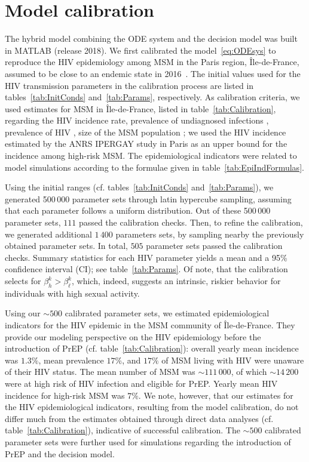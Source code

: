 \documentclass[11pt]{article}
\begin{document}
\newpage
\section{Model calibration} \label{sec:Calibration}

The hybrid model combining the ODE system and the decision model was built in MATLAB (release 2018). We first calibrated the model~\eqref{eq:ODEsys} to reproduce the HIV epidemiology among MSM in the Paris region, \^Ile-de-France, assumed to be close to an endemic state in 2016~\cite{RapportSPF2019}. The initial values used for the HIV transmission parameters in the calibration process are listed in tables~\ref{tab:InitConds} and~\ref{tab:Params}, respectively. As calibration criteria, we used estimates for MSM in \^Ile-de-France, listed in table~\ref{tab:Calibration}, regarding the HIV incidence rate, prevalence of undiagnosed infections \cite{Marty2019}, prevalence of HIV \cite{Prevagay2017}, size of the MSM population \cite{Bajos2018,Insee2015}; we used the HIV incidence estimated by the ANRS IPERGAY study in Paris \cite{Molina2018} as an upper bound for the incidence among high-risk MSM. The epidemiological indicators were related to model simulations according to the formulae given in table~\ref{tab:EpiIndFormulas}. 

Using the initial ranges (cf. tables~\ref{tab:InitConds} and~\ref{tab:Params}), we generated 500\,000 parameter sets through latin hypercube sampling, assuming that each parameter follows a uniform distribution. Out of these 500\,000 parameter sets, $111$ passed the calibration checks. Then, to refine the calibration, we generated additional $1\,400$ parameters sets, by sampling nearby the previously obtained parameter sets. In total, $505$ parameter sets passed the calibration checks. Summary statistics for each HIV parameter yields a mean and a 95\% confidence interval (CI); see table~\ref{tab:Params}.  Of note, that the calibration selects for $\beta^k_h>\beta^k_\ell$, which, indeed, suggests an intrinsic, riskier behavior for individuals with high sexual activity. 

Using our $\sim500$ calibrated parameter sets, we estimated epidemiological indicators for the HIV epidemic in the MSM community of \^Ile-de-France.  They provide our modeling perspective on the HIV epidemiology before the introduction of PrEP (cf. table~\ref{tab:Calibration}): overall yearly mean incidence was $1.3\%$, mean prevalence $17\%$, and $17\%$ of MSM living with HIV were unaware of their HIV status. The mean number of MSM was $\sim111\,000$, of which $\sim14\,200$ were at high risk of HIV infection and eligible for PrEP. Yearly mean HIV incidence for high-risk MSM was $7\%$. We note, however, that our estimates for the HIV epidemiological indicators, resulting from the model calibration, do not differ much from the estimates obtained through direct data analyses (cf. table~\ref{tab:Calibration}), indicative of successful calibration. The $\sim500$ calibrated parameter sets were further used for simulations regarding the introduction of PrEP and the decision model.
\end{document}
